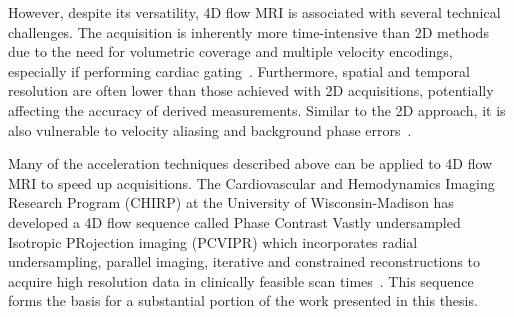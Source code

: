 However, despite its versatility, 4D flow MRI is associated with several technical challenges. The acquisition is inherently more time-intensive than 2D methods due to the need for volumetric coverage and multiple velocity encodings, especially if performing cardiac gating~\cite{dyverfeldt4DFlowCardiovascular2015}. Furthermore, spatial and temporal resolution are often lower than those achieved with 2D acquisitions, potentially affecting the accuracy of derived measurements. Similar to the 2D approach, it is also vulnerable to velocity aliasing and background phase errors~\cite{markl4DFlowMRI2012}.

Many of the acceleration techniques described above can be applied to 4D flow MRI to speed up acquisitions. The Cardiovascular and Hemodynamics Imaging Research Program (CHIRP) at the University of Wisconsin-Madison has developed a 4D flow sequence called Phase Contrast Vastly undersampled Isotropic PRojection imaging (PCVIPR) which incorporates radial undersampling, parallel imaging, iterative and constrained reconstructions to acquire high resolution data in clinically feasible scan times~\cite{johnsonImproved3DPhase2008}. This sequence forms the basis for a substantial portion of the work presented in this thesis.

